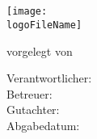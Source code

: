 \begin{titlepage}
    \begin{center}
        \large
        \institution\\
        \department\\
        \subject\\
        \vspace{0.5cm}
        \texttt{[image: \\logoFileName]}

        \vspace{1.5cm}

        \Huge
        \textbf{\thesisTitle}
        \vspace{1.5cm}

        \Large
        \textbf{\thesisType}
        \vspace{1.0cm}

        vorgelegt von\\
        \vspace{0.5cm}
        \textbf{\name}

        \vspace{1.5cm}


        \vfill
        \large
        Verantwortlicher: \responsiblePerson\\
        Betreuer: \supervisor\\
        Gutachter: \reviewer\\
        Abgabedatum: \submissionDate

    \end{center}
\end{titlepage}
